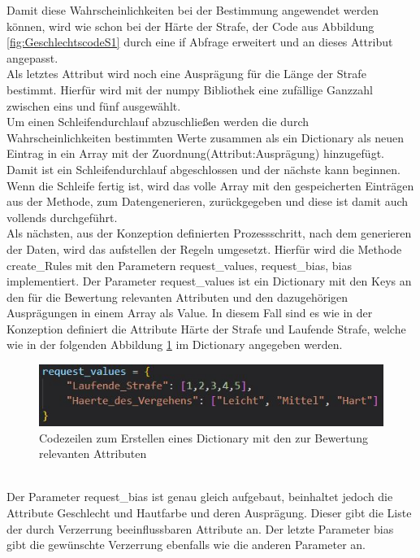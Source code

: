 \begin{onehalfspace}
Damit diese Wahrscheinlichkeiten bei der Bestimmung angewendet werden können, wird wie schon bei der Härte der Strafe, der Code aus Abbildung \ref{fig:GeschlechtscodeS1} durch eine if Abfrage erweitert und an dieses Attribut angepasst.\\
Als letztes Attribut wird noch eine Ausprägung für die Länge der Strafe bestimmt. Hierfür wird mit der \glqq{}numpy\grqq{} Bibliothek eine zufällige Ganzzahl zwischen eins und fünf ausgewählt.\\
Um einen Schleifendurchlauf abzuschließen werden die durch Wahrscheinlichkeiten bestimmten Werte zusammen als ein Dictionary als neuen Eintrag in ein Array mit der Zuordnung(Attribut:Ausprägung) hinzugefügt. Damit ist ein Schleifendurchlauf abgeschlossen und der nächste kann beginnen. Wenn die Schleife fertig ist, wird das volle Array mit den gespeicherten Einträgen aus der Methode, zum Datengenerieren, zurückgegeben und diese ist damit auch vollends durchgeführt.\\
Als nächsten, aus der Konzeption definierten Prozessschritt, nach dem generieren der Daten, wird das aufstellen der Regeln umgesetzt. Hierfür wird die Methode \glqq{}create\_Rules\grqq{} mit den Parametern \glqq{}request\_values, request\_bias, bias\grqq{} implementiert. Der Parameter \glqq{}request\_values\grqq{} ist ein Dictionary mit den Keys an den für die Bewertung relevanten Attributen und den dazugehörigen Ausprägungen in einem Array als Value. In diesem Fall sind es wie in der Konzeption definiert die Attribute Härte der Strafe und Laufende Strafe, welche wie in der folgenden Abbildung \ref{fig:RequestValues} im Dictionary angegeben werden.\\
\begin{figure}[h]
    \centering
    \includegraphics{Diagramme/Sz1_RequestValues.JPG}
    \caption{Codezeilen zum Erstellen eines Dictionary mit den zur Bewertung relevanten Attributen}
    \label{fig:RequestValues}
\end{figure}\\
Der Parameter \glqq{}request\_bias\grqq{} ist genau gleich aufgebaut, beinhaltet jedoch die Attribute Geschlecht und Hautfarbe und deren Ausprägung. Dieser gibt die Liste der durch Verzerrung beeinflussbaren Attribute an. Der letzte Parameter \glqq{}bias\grqq{} gibt die gewünschte Verzerrung ebenfalls wie die anderen Parameter an. 

\end{onehalfspace}
